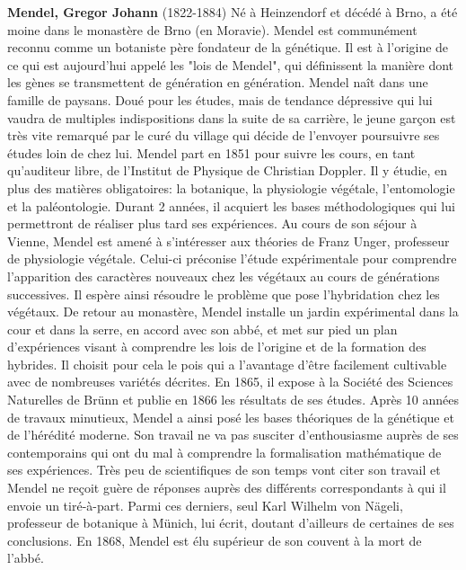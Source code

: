 \textbf{Mendel, Gregor Johann} (1822-1884) Né à Heinzendorf et décédé à Brno, a été moine dans le monastère de Brno (en Moravie). Mendel est communément reconnu comme un botaniste père fondateur de la génétique. Il est à l'origine de ce qui est aujourd'hui appelé les "lois de Mendel", qui définissent la manière dont les gènes se transmettent de génération en génération. Mendel naît dans une famille de paysans. Doué pour les études, mais de tendance dépressive qui lui vaudra de multiples indispositions dans la suite de sa carrière, le jeune garçon est très vite remarqué par le curé du village qui décide de l'envoyer poursuivre ses études loin de chez lui. Mendel part en 1851 pour suivre les cours, en tant qu'auditeur libre, de l'Institut de Physique de Christian Doppler. Il y étudie, en plus des matières obligatoires: la botanique, la physiologie végétale, l'entomologie et la paléontologie. Durant 2 années, il acquiert les bases méthodologiques qui lui permettront de réaliser plus tard ses expériences. Au cours de son séjour à Vienne, Mendel est amené à s'intéresser aux théories de Franz Unger, professeur de physiologie végétale. Celui-ci préconise l'étude expérimentale pour comprendre l'apparition des caractères nouveaux chez les végétaux au cours de générations successives. Il espère ainsi résoudre le problème que pose l'hybridation chez les végétaux. De retour au monastère, Mendel installe un jardin expérimental dans la cour et dans la serre, en accord avec son abbé, et met sur pied un plan d'expériences visant à comprendre les lois de l'origine et de la formation des hybrides. Il choisit pour cela le pois qui a l'avantage d'être facilement cultivable avec de nombreuses variétés décrites. En 1865, il expose à la Société des Sciences Naturelles de Brünn et publie en 1866 les résultats de ses études. Après 10 années de travaux minutieux, Mendel a ainsi posé les bases théoriques de la génétique et de l'hérédité moderne. Son travail ne va pas susciter d'enthousiasme auprès de ses contemporains qui ont du mal à comprendre la formalisation mathématique de ses expériences. Très peu de scientifiques de son temps vont citer son travail et Mendel ne reçoit guère de réponses auprès des différents correspondants à qui il envoie un tiré-à-part. Parmi ces derniers, seul Karl Wilhelm von Nägeli, professeur de botanique à Münich, lui écrit, doutant d'ailleurs de certaines de ses conclusions. En 1868, Mendel est élu supérieur de son couvent à la mort de l'abbé.

